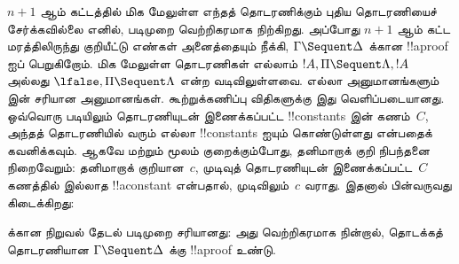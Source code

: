 \documentclass[../../../include/open-logic-section]{subfiles}
\begin{document}
$n+1$ ஆம் கட்டத்தில் மிக மேலுள்ள எந்தத்
தொடரணிக்கும் புதிய தொடரணியைச் சேர்க்கவில்லை
எனில், படிமுறை வெற்றிகரமாக நிற்கிறது. அப்போது
$n+1$ ஆம் கட்ட மரத்திலிருந்து குறியீட்டு எண்கள்
அனைத்தையும் நீக்கி, $\Gamma \Sequent \Delta$
க்கான !!a{proof} ஐப் பெறுகிறோம். மிக மேலுள்ள
தொடரணிகள் எல்லாம் $!A, \Pi \Sequent \Lambda, !A$
அல்லது $\lfalse, \Pi \Sequent \Lambda$ என்ற
வடிவிலுள்ளவை. எல்லா அனுமானங்களும் 
இன் சரியான அனுமானங்கள். கூற்றுக்கணிப்பு விதிகளுக்கு
இது வெளிப்படையானது. ஒவ்வொரு படியிலும் தொடரணியுடன்
இணைக்கப்பட்ட !!{constant}s இன் கணம்~$C$,
அந்தத் தொடரணியில் வரும் எல்லா !!{constant}s
ஐயும் கொண்டுள்ளது என்பதைக் கவனிக்கவும்.
ஆகவே \LeftR{\lexists} மற்றும்
\RightR{\lforall} மூலம் குறைக்கும்போது,
தனிமாறாக் குறி நிபந்தனை நிறைவேறும்:
தனிமாறாக் குறியான~$c$, முடிவுத் தொடரணியுடன்
இணைக்கப்பட்ட~$C$ கணத்தில் இல்லாத
!!a{constant} என்பதால், முடிவிலும்~$c$ வராது.
இதனால் பின்வருவது கிடைக்கிறது:

\begin{prop}
 க்கான நிறுவல் தேடல் படிமுறை சரியானது:
அது வெற்றிகரமாக நின்றால், தொடக்கத் தொடரணியான
$\Gamma \Sequent \Delta$ க்கு
!!a{proof} உண்டு.
\end{prop}
\end{document}
